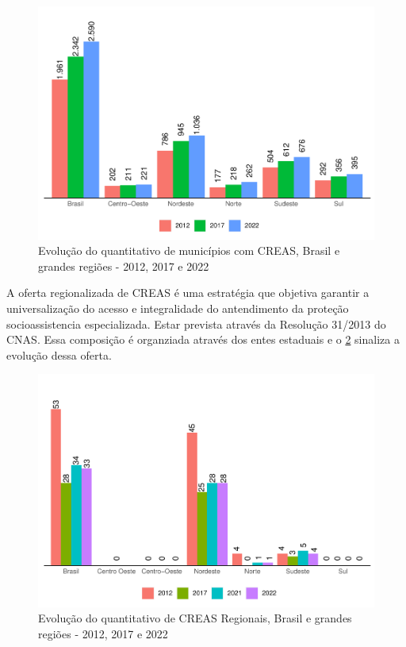 \documentclass[
  brazilian]{report}
\begin{document}
\begin{figure}
\includegraphics{Censo-SUAS-2022_files/figure-latex/CREAS-quantidade-municipios-1} \caption[Evolução do quantitativo de municípios com CREAS, Brasil e grandes regiões - 2012, 2017 e 2022]{Evolução do quantitativo de municípios com CREAS, Brasil e grandes regiões - 2012, 2017 e 2022}\label{fig:CREAS-quantidade-municipios}
\end{figure}

A oferta regionalizada de CREAS é uma estratégia que objetiva garantir a
universalização do acesso e integralidade do antendimento da proteção
socioassistencia especializada. Estar prevista através da Resolução
31/2013 do CNAS. Essa composição é organziada através dos entes
estaduais e o \cref{fig:creas-regionais} sinaliza a evolução dessa
oferta.

\begin{figure}
\includegraphics{Censo-SUAS-2022_files/figure-latex/creas-regionais-1} \caption[Evolução do quantitativo de CREAS Regionais, Brasil e grandes regiões - 2012, 2017 e 2022]{Evolução do quantitativo de CREAS Regionais, Brasil e grandes regiões - 2012, 2017 e 2022}\label{fig:creas-regionais}
\end{figure}
\end{document}
